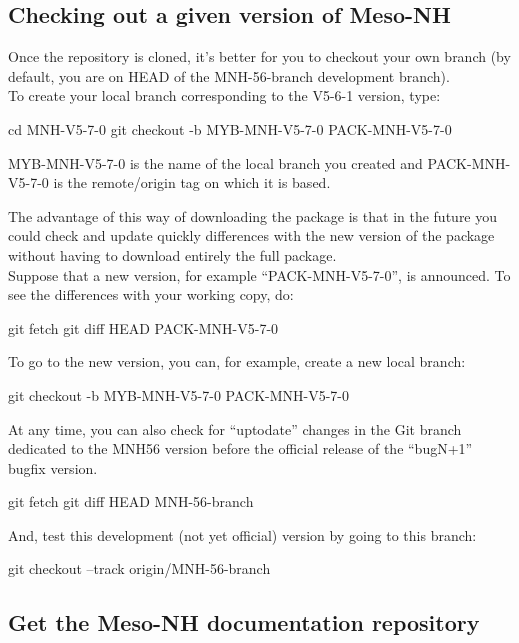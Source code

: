 \subsection{Checking out a given version of Meso-NH}

Once the repository is cloned, it's better for you to checkout your own branch (by default, you are on HEAD of the MNH-56-branch development branch). \\

To create your local branch corresponding to the V5-6-1 version, type:
\begin{bashcode}
cd MNH-V5-7-0
git checkout -b MYB-MNH-V5-7-0 PACK-MNH-V5-7-0
\end{bashcode}

MYB-MNH-V5-7-0 is the name of the local branch you created and PACK-MNH-V5-7-0 is the remote/origin tag on which it is based.

The advantage of this way of downloading the package is that in the future you could check and update quickly differences with the new version of the package without having to download entirely the full package. \\

Suppose that a new version, for example ``PACK-MNH-V5-7-0'', is announced. To see the differences with your working copy, do:
\begin{bashcode}
git fetch
git diff HEAD PACK-MNH-V5-7-0
\end{bashcode}

To go to the new version, you can, for example, create a new local branch:
\begin{bashcode}
git checkout -b MYB-MNH-V5-7-0 PACK-MNH-V5-7-0
\end{bashcode}

At any time, you can also check for ``uptodate'' changes in the Git branch dedicated to the MNH56 version before the official release of the ``bugN+1'' bugfix version.
\begin{bashcode}
git fetch
git diff HEAD MNH-56-branch
\end{bashcode}

And, test this development (not yet official) version by going to this branch:
\begin{bashcode}
git checkout --track origin/MNH-56-branch
\end{bashcode}

\subsection{Get the Meso-NH documentation repository}

